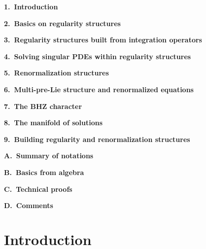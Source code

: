 \documentclass[10pt, reqno]{amsart}
\numberwithin{subsection}{section}
\numberwithin{subsubsection}{subsection}
\numberwithin{equation}{section} %
\theoremstyle{mystyle}
\theoremstyle{mystyle2}
\theoremstyle{mystyle3}
\begin{document}
{\sf 
\begin{center}
\begin{minipage}[t]{11cm}
\baselineskip =0.35cm
{\scriptsize 


\vspace{0.1cm}

\textbf{ 1.~Introduction\dotfill 
\pageref{SectionIntro}}

\textbf{ 2.~Basics on regularity structures\dotfill 
\pageref{SectionBasicsRS}}

\textbf{ 3.~Regularity structures built from integration operators\dotfill
\pageref{SectionIntegration}}

\textbf{ 4.~Solving singular PDEs within regularity structures\dotfill 
\pageref{SectionSolvingPDEs}}

\textbf{ 5.~Renormalization structures\dotfill 
\pageref{SectionConcreteRenormStructure}}

\textbf{ 6.~Multi-pre-Lie structure and renormalized equations\dotfill 
\pageref{SectionMultiAndrenormalizedEquations}}

\textbf{ 7.~The BHZ character\dotfill 
\pageref{SectionBHZCharacter}}

\textbf{ 8.~The manifold of solutions\dotfill 
\pageref{SectionManifold}}

\textbf{ 9.~Building regularity and renormalization structures\dotfill 
\pageref{SectionBuildingRS}}

\textbf{ A.~Summary of notations\dotfill
\pageref{SectionAppendixSummary}}

\textbf{ B.~Basics from algebra\dotfill
\pageref{SectionAppendixAlgebra}}

\textbf{ C.~Technical proofs\dotfill
\pageref{SectionAppendixProofs}}

\textbf{ D.~Comments\dotfill
\pageref{SectionAppendixComments}}

}\end{minipage}
\end{center}
}   \vspace{1cm}



\vspace{0.6cm}

\section{Introduction}
\label{SectionIntro}
\end{document}
